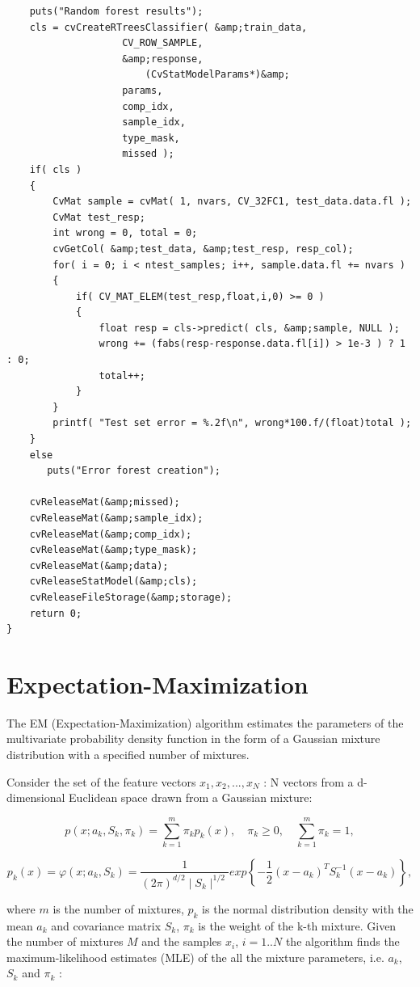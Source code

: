 \begin{lstlisting}
    puts("Random forest results");
    cls = cvCreateRTreesClassifier( &amp;train_data, 
				    CV_ROW_SAMPLE, 
				    &amp;response,
        			    (CvStatModelParams*)&amp; 
				    params, 
				    comp_idx, 
				    sample_idx, 
				    type_mask, 
				    missed );
    if( cls )
    {
        CvMat sample = cvMat( 1, nvars, CV_32FC1, test_data.data.fl );
        CvMat test_resp;
        int wrong = 0, total = 0;
        cvGetCol( &amp;test_data, &amp;test_resp, resp_col);
        for( i = 0; i < ntest_samples; i++, sample.data.fl += nvars )
        {
            if( CV_MAT_ELEM(test_resp,float,i,0) >= 0 )
            {
                float resp = cls->predict( cls, &amp;sample, NULL );
                wrong += (fabs(resp-response.data.fl[i]) > 1e-3 ) ? 1 : 0;
                total++;
            }
        }
        printf( "Test set error = %.2f\n", wrong*100.f/(float)total );
    }
    else
       puts("Error forest creation");

    cvReleaseMat(&amp;missed);
    cvReleaseMat(&amp;sample_idx);
    cvReleaseMat(&amp;comp_idx);
    cvReleaseMat(&amp;type_mask);
    cvReleaseMat(&amp;data);
    cvReleaseStatModel(&amp;cls);
    cvReleaseFileStorage(&amp;storage);
    return 0;
}
\end{lstlisting}

\section{Expectation-Maximization}

The EM (Expectation-Maximization) algorithm estimates the parameters of the multivariate probability density function in the form of a Gaussian mixture distribution with a specified number of mixtures.

Consider the set of the feature vectors $x_1, x_2,...,x_{N}$ : N vectors from a d-dimensional Euclidean space drawn from a Gaussian mixture:

\[
p(x;a_k,S_k,\pi_k) = \sum_{k=1}^{m}\pi_kp_k(x), \quad \pi_k \geq 0, \quad \sum_{k=1}^{m}\pi_k=1,
\]

\[
p_k(x)=\varphi(x;a_k,S_k)=\frac{1}{(2\pi)^{d/2}\mid{S_k}\mid^{1/2}}exp\left\{-\frac{1}{2}(x-a_k)^TS_k^{-1}(x-a_k)\right\},
\]

where $m$ is the number of mixtures, $p_k$ is the normal distribution
density with the mean $a_k$ and covariance matrix $S_k$, $\pi_k$
is the weight of the k-th mixture. Given the number of mixtures
$M$ and the samples $x_i$, $i=1..N$ the algorithm finds the
maximum-likelihood estimates (MLE) of the all the mixture parameters,
i.e. $a_k$, $S_k$ and $\pi_k$ :

